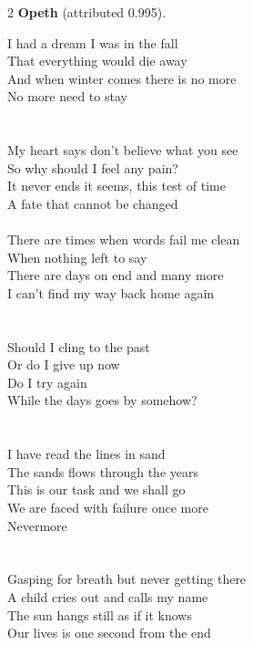 \begin{multicols}{2}
\nopagebreak\noindent\textbf{Opeth} (attributed 0.995).\par\nopagebreak\vspace{4pt}
{\footnotesize\itshape\raggedright
I had a dream I was in the fall \\
That everything would die away \\
And when winter comes there is no more \\
No more need to stay \\
\mbox{} \\
\mbox{} \\
My heart says don't believe what you see \\
So why should I feel any pain? \\
It never ends it seems, this test of time \\
A fate that cannot be changed \\
\mbox{} \\
There are times when words fail me clean \\
When nothing left to say \\
There are days on end and many more \\
I can't find my way back home again \\
\mbox{} \\
\mbox{} \\
Should I cling to the past \\
Or do I give up now \\
Do I try again \\
While the days goes by somehow? \\
\mbox{} \\
\mbox{} \\
I have read the lines in sand \\
The sands flows through the years \\
This is our task and we shall go \\
We are faced with failure once more \\
Nevermore \\
\mbox{} \\
\mbox{} \\
Gasping for breath but never getting there \\
A child cries out and calls my name \\
The sun hangs still as if it knows \\
Our lives is one second from the end\par}
\medskip


\end{multicols}

